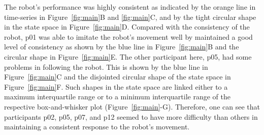 \documentclass{sig-alternate-05-2015}
\begin{document}
The robot's performance was highly consistent 
as indicated by the orange line in time-series in Figure~\ref{fig:main}B and \ref{fig:main}C,
and by the tight circular shape in the state space in Figure~\ref{fig:main}D.
Compared with the consistency of the robot, 
p01 was able to imitate the robot's movement well
by maintained a good level of consistency
as shown by the blue line in Figure~\ref{fig:main}B and 
the circular shape in Figure~\ref{fig:main}E.
The other participant here, p05, had some problems in following the robot.
This is shown by the blue line in 
Figure~\ref{fig:main}C and the disjointed circular shape 
of the  state space in Figure~\ref{fig:main}F.
Such shapes in the  state space are linked either 
to a maximum interquartile range
or 
to a minimum interquartile range of the respective box-and-whisker plot (Figure~\ref{fig:main}-G).
Therefore, one  can see that participants p02, p05, p07, and p12 seemed
to have more difficulty than others in maintaining a consistent response
to the robot's movement.





% 



\end{document}
